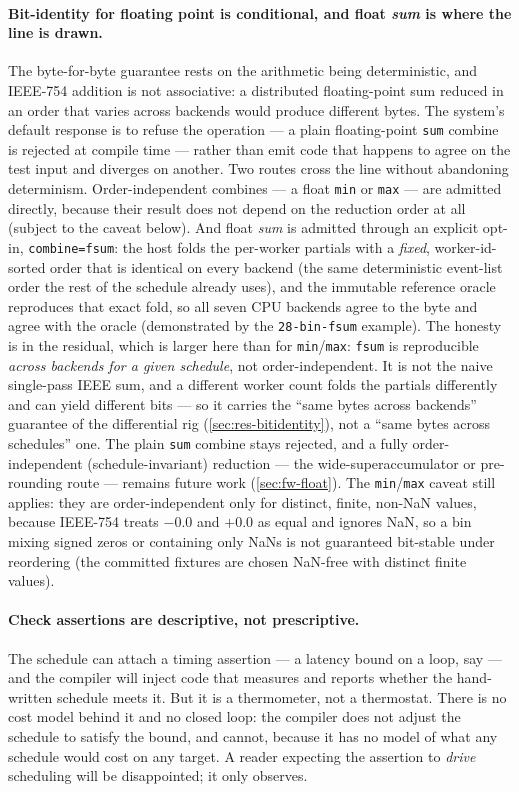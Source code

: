 \paragraph{Bit-identity for floating point is conditional, and float \emph{sum} is
where the line is drawn.} The byte-for-byte guarantee rests on the arithmetic being
deterministic, and IEEE-754 addition is not associative: a distributed floating-point
sum reduced in an order that varies across backends would produce different bytes. The
system's default response is to refuse the operation --- a plain floating-point
\texttt{sum} combine is rejected at compile time --- rather than emit code that happens
to agree on the test input and diverges on another. Two routes cross the line without
abandoning determinism. Order-independent combines --- a float \texttt{min} or
\texttt{max} --- are admitted directly, because their result does not depend on the
reduction order at all (subject to the caveat below). And float \emph{sum} is admitted
through an explicit opt-in, \texttt{combine=fsum}: the host folds the per-worker
partials with a \emph{fixed}, worker-id-sorted order that is identical on every backend
(the same deterministic event-list order the rest of the schedule already uses), and
the immutable reference oracle reproduces that exact fold, so all seven CPU backends
agree to the byte and agree with the oracle (demonstrated by the \texttt{28-bin-fsum}
example). The honesty is in the residual, which is larger here than for
\texttt{min}/\texttt{max}: \texttt{fsum} is reproducible \emph{across backends for a
given schedule}, not order-independent. It is not the naive single-pass IEEE sum, and a
different worker count folds the partials differently and can yield different bits --- so
it carries the ``same bytes across backends'' guarantee of the differential rig
(\cref{sec:res-bitidentity}), not a ``same bytes across schedules'' one. The plain \texttt{sum} combine stays rejected, and a fully
order-independent (schedule-invariant) reduction --- the wide-superaccumulator or
pre-rounding route --- remains future work (\cref{sec:fw-float}). The
\texttt{min}/\texttt{max} caveat still applies: they are order-independent only for
distinct, finite, non-NaN values, because IEEE-754 treats $-0.0$ and $+0.0$ as equal
and ignores NaN, so a bin mixing signed zeros or containing only NaNs is not guaranteed
bit-stable under reordering (the committed fixtures are chosen NaN-free with distinct
finite values).

\paragraph{Check assertions are descriptive, not prescriptive.} The schedule can
attach a timing assertion --- a latency bound on a loop, say --- and the compiler
will inject code that measures and reports whether the hand-written schedule meets
it. But it is a thermometer, not a thermostat. There is no cost model behind it and
no closed loop: the compiler does not adjust the schedule to satisfy the bound, and
cannot, because it has no model of what any schedule would cost on any target. A
reader expecting the assertion to \emph{drive} scheduling will be disappointed; it
only observes.

